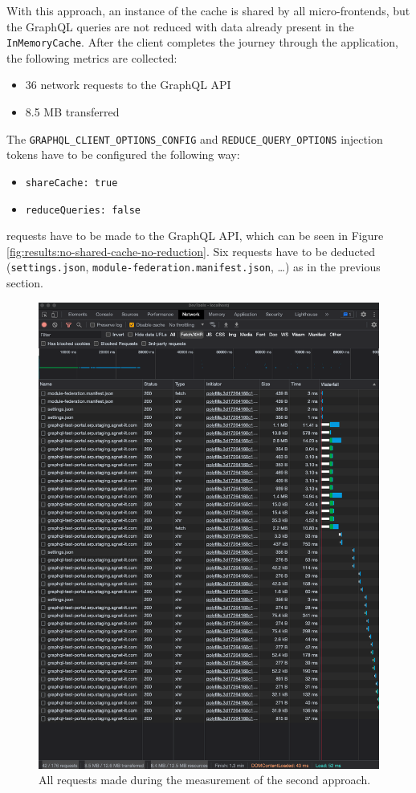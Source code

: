 With this approach, an instance of the cache is shared by all micro-frontends, but the GraphQL queries are not reduced with data already present in the \texttt{InMemoryCache}. After the client completes the journey through the application, the following metrics are collected:

\begin{itemize}
  \item 36 network requests to the GraphQL \ac{API}
  \item 8.5 MB transferred
\end{itemize}

\noindent The \texttt{GRAPHQL\_CLIENT\_OPTIONS\_CONFIG} and \texttt{REDUCE\_QUERY\_OPTIONS} injection tokens have to be configured the following way:

\begin{itemize}
  \item \texttt{shareCache: true}
  \item \texttt{reduceQueries: false}
\end{itemize}

 requests have to be made to the GraphQL \ac{API}, which can be seen in Figure \ref{fig:results:no-shared-cache-no-reduction}. Six requests have to be deducted (\texttt{settings.json}, \texttt{module-federation.manifest.json}, \dots) as in the previous section.

\ifshowImages
\begin{figure}[H]
\centering
\includegraphics[width=0.7\linewidth]{images/results/1-attempt/shared-not-reduced-cache.png}
\caption{All requests made during the measurement of the second approach.}\label{fig:results:shared-cache-no-reduction}
\end{figure}
\fi

